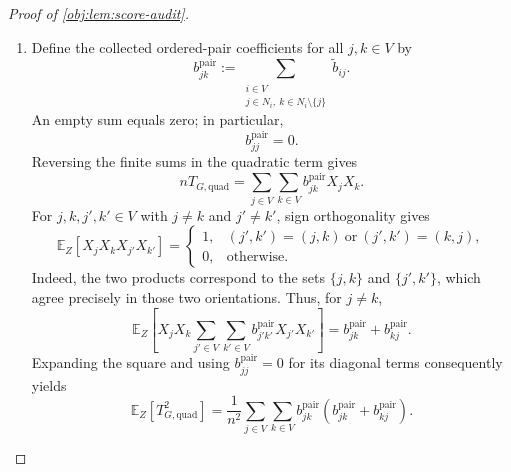 \documentclass[11pt]{article}
\begin{document}
\begin{proof}[Proof of \cref{obj:lem:score-audit}]
\begin{enumerate}
The sign orthogonality above, applied to singleton sets, gives
\[
\mathbb E_Z[T_{G,\mathrm{lin}}^2]
=
\frac4{n^2}\sum_{j\in V}
\left(\sum_{\substack{i\in V\\j\in N_i}}\mu_i\right)^2.
\]
For each \(j\), finite Cauchy--Schwarz and the coordinate multiplicity bound yield
\[
\left(\sum_{\substack{i\in V\\j\in N_i}}\mu_i\right)^2
\le
\left|\{i\in V:j\in N_i\}\right|
\sum_{\substack{i\in V\\j\in N_i}}\mu_i^2
\le
d_+\sum_{\substack{i\in V\\j\in N_i}}\mu_i^2.
\]
Summing and reversing the finite sums gives
\[
\begin{aligned}
\sum_{j\in V}
\left(\sum_{\substack{i\in V\\j\in N_i}}\mu_i\right)^2
&\le d_+\sum_{j\in V}\sum_{\substack{i\in V\\j\in N_i}}\mu_i^2\\
&=d_+\sum_{i\in V}|N_i|\mu_i^2\\
&\le d_+\sum_{i\in V}d_+
=nd_+^2.
\end{aligned}
\]
Since \(n\ge4\), scaling by \(4/n^2\) therefore gives
\[
\mathbb E_Z[T_{G,\mathrm{lin}}^2]\le\frac{4d_+^2}{n}.
\]

\item Define the collected ordered-pair coefficients for all \(j,k\in V\) by
\[
b^{\mathrm{pair}}_{jk}
:=
\sum_{\substack{i\in V\\j\in N_i,\ k\in N_i\setminus\{j\}}}
\widetilde b_{ij}.
\]
An empty sum equals zero; in particular,
\[
b^{\mathrm{pair}}_{jj}=0.
\]
Reversing the finite sums in the quadratic term gives
\[
nT_{G,\mathrm{quad}}
=\sum_{j\in V}\sum_{k\in V}b^{\mathrm{pair}}_{jk}X_jX_k.
\]
For \(j,k,j',k'\in V\) with \(j\ne k\) and \(j'\ne k'\), sign orthogonality gives
\[
\mathbb E_Z[X_jX_kX_{j'}X_{k'}]
=
\begin{cases}
1,&(j',k')=(j,k)\ \text{or}\ (j',k')=(k,j),\\
0,&\text{otherwise}.
\end{cases}
\]
Indeed, the two products correspond to the sets \(\{j,k\}\) and \(\{j',k'\}\), which agree precisely in those two orientations. Thus, for \(j\ne k\),
\[
\mathbb E_Z\!\left[
X_jX_k\sum_{j'\in V}\sum_{k'\in V}
b^{\mathrm{pair}}_{j'k'}X_{j'}X_{k'}
\right]
=b^{\mathrm{pair}}_{jk}+b^{\mathrm{pair}}_{kj}.
\]
Expanding the square and using \(b^{\mathrm{pair}}_{jj}=0\) for its diagonal terms consequently yields
\[
\mathbb E_Z[T_{G,\mathrm{quad}}^2]
=
\frac1{n^2}\sum_{j\in V}\sum_{k\in V}
b^{\mathrm{pair}}_{jk}
\left(b^{\mathrm{pair}}_{jk}+b^{\mathrm{pair}}_{kj}\right).
\]


\end{enumerate}
\end{proof}
\end{document}

